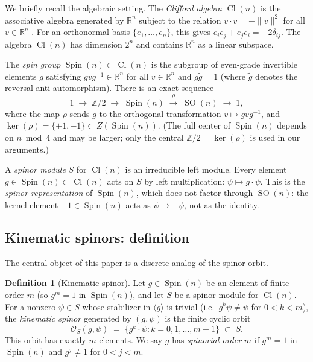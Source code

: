 \documentclass[11pt,reqno]{amsart}
\theoremstyle{plain}
\theoremstyle{definition}
\newtheorem{definition}[theorem]{Definition}
\theoremstyle{remark}
\newcommand{\R}{\mathbb{R}}
\newcommand{\Z}{\mathbb{Z}}
\DeclareMathOperator{\Spin}{Spin}
\DeclareMathOperator{\SO}{SO}
\DeclareMathOperator{\Cl}{Cl}
\begin{document}
We briefly recall the algebraic setting.
The \emph{Clifford algebra} $\Cl(n)$ is the associative
algebra generated by $\R^n$ subject to the relation
$v \cdot v = -\|v\|^2$ for all $v \in \R^n$
\cite{LawsonMichelsohn1989}.
For an orthonormal basis $\{e_1,\ldots,e_n\}$, this gives
$e_i e_j + e_j e_i = -2\delta_{ij}$.
The algebra $\Cl(n)$ has dimension $2^n$ and contains
$\R^n$ as a linear subspace.

The \emph{spin group} $\Spin(n) \subset \Cl(n)$ is the
subgroup of even-grade invertible elements $g$ satisfying
$g v g^{-1} \in \R^n$ for all $v \in \R^n$ and
$g \tilde{g} = 1$ (where $\tilde{g}$ denotes the reversal
anti-automorphism).
There is an exact sequence
\begin{equation}\label{eq:doublecover}
  1 \;\longrightarrow\; \Z/2 \;\longrightarrow\;
  \Spin(n) \;\xrightarrow{\;\rho\;}\;
  \SO(n) \;\longrightarrow\; 1,
\end{equation}
where the map $\rho$ sends $g$ to the orthogonal transformation
$v \mapsto g v g^{-1}$, and
$\ker(\rho) = \{+1, -1\} \subset Z(\Spin(n))$.
(The full center of $\Spin(n)$ depends on $n \bmod 4$
and may be larger; only the central $\Z/2 = \ker(\rho)$
is used in our arguments.)

A \emph{spinor module} $S$ for $\Cl(n)$ is an irreducible
left module.
Every element $g \in \Spin(n) \subset \Cl(n)$ acts on $S$ by
left multiplication: $\psi \mapsto g \cdot \psi$.
This is the \emph{spinor representation} of $\Spin(n)$,
which does not factor through $\SO(n)$: the kernel element
$-1 \in \Spin(n)$ acts as $\psi \mapsto -\psi$, not as the
identity.

\subsection{Kinematic spinors: definition}

The central object of this paper is a discrete analog of the
spinor orbit.

\begin{definition}[Kinematic spinor]\label{def:kinematic}
Let $g \in \Spin(n)$ be an element of finite order $m$
(so $g^m = 1$ in $\Spin(n)$),
and let $S$ be a spinor module for $\Cl(n)$.
For a nonzero $\psi \in S$ whose stabilizer in
$\langle g \rangle$ is trivial
(i.e.\ $g^k \psi \neq \psi$ for $0 < k < m$),
the \emph{kinematic spinor}
generated by $(g, \psi)$ is the finite cyclic orbit
\[
  \mathcal{O}_S(g,\psi) \;=\;
  \bigl\{g^k \cdot \psi : k = 0, 1, \ldots, m-1\bigr\}
  \;\subset\; S.
\]
This orbit has exactly $m$ elements.
We say $g$ has \emph{spinorial order} $m$ if $g^m = 1$
in $\Spin(n)$ and $g^j \neq 1$ for $0 < j < m$.
\end{definition}
\end{document}
